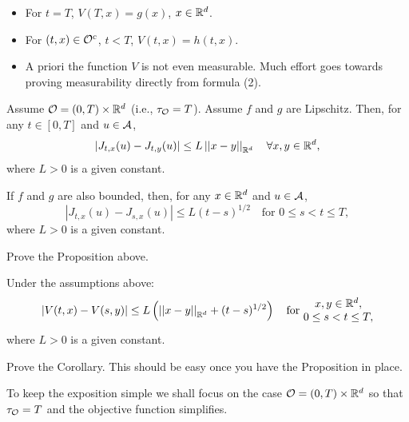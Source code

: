 \begin{remark}[Observations]
    \begin{itemize}
        \item For $t=T$, $V(T,x) = g(x)$, $x \in \mathbb R^d$.
        \item For $(t,x) \in \mathcal{O}^c$, $t < T$, $V(t,x) = h(t,x)$.
        \item A priori the function $V$ is not even measurable. Much effort goes towards proving measurability directly from formula (2).
    \end{itemize}
\end{remark}

\begin{proposition}
    Assume $\mathcal{O} = (0,T) \times \mathbb R^d$ (i.e., $\tau_{\mathcal{O}} = T$). Assume $f$ and $g$ are Lipschitz. Then, for any $t \in [0,T]$ and $u \in \mathcal{A}$,
    \[ |J_{t,x}(u) - J_{t,y}(u)| \leq L \left|\left|x-y\right|\right|_{\mathbb R^d} \quad \forall x,y \in \mathbb R^d, \]
    where $L > 0$ is a given constant.
    
    If $f$ and $g$ are also bounded, then, for any $x \in \mathbb R^d$ and $u \in \mathcal{A}$,
    \[ |J_{t,x}(u) - J_{s,x}(u)| \leq L(t-s)^{1/2} \quad \text{for } 0 \leq s < t \leq T, \]
    where $L > 0$ is a given constant.
\end{proposition}

\begin{homework}[Advanced]
    Prove the Proposition above.
\end{homework}

\begin{corollary}
    Under the assumptions above:
    \[ |V(t,x) - V(s,y)| \leq L \left(\left|\left|x-y\right|\right|_{\mathbb R^d} + (t-s)^{1/2}\right) \quad \text{for } \begin{matrix} x,y \in \mathbb R^d, \\ 0 \leq s < t \leq T, \end{matrix} \]
    where $L > 0$ is a given constant.
\end{corollary}

\begin{homework}
    Prove the Corollary. This should be easy once you have the Proposition in place.
\end{homework}

\begin{remark}
    To keep the exposition simple we shall focus on the case $\mathcal{O} = (0,T) \times \mathbb R^d$ so that $\tau_{\mathcal{O}} = T$ and the objective function simplifies.
\end{remark}

